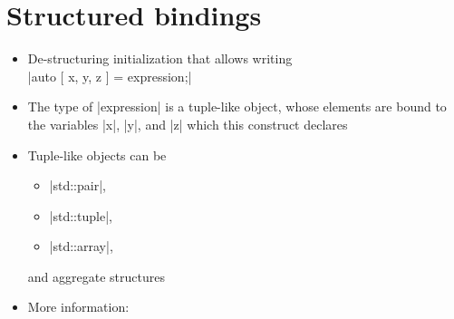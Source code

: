\section{Structured bindings}
\begin{frame}[fragile]{\insertsectionhead}
    \vspace{-3mm}
    \begin{itemize}
        \item De-structuring initialization that allows writing\\
              \quad\CPP|auto [ x, y, z ] = expression;|
        \item The type of \CPP|expression| is a tuple-like object, whose elements are bound to the variables \CPP|x|, \CPP|y|, and \CPP|z| which this construct declares
        \item Tuple-like objects can be\\
              \begin{itemize}
                  \item[] \CPP|std::pair|,
                  \item[] \CPP|std::tuple|,
                  \item[] \CPP|std::array|,
              \end{itemize}
              and aggregate structures
        \item More information: 
    \end{itemize}
\end{frame}
